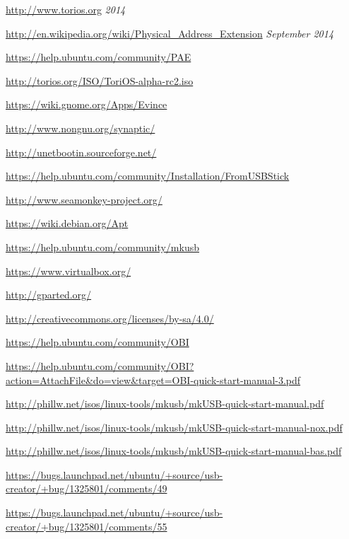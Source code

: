 \documentclass[12pt,a4paper]{book}
\begin{document}
\begin{thebibliography}{1} %

\url{http://www.torios.org}
\emph{2014}

\url{http://en.wikipedia.org/wiki/Physical_Address_Extension}
\emph{September 2014}

\url{https://help.ubuntu.com/community/PAE}

\url{http://torios.org/ISO/ToriOS-alpha-rc2.iso}

\url{https://wiki.gnome.org/Apps/Evince}

\url{http://www.nongnu.org/synaptic/}

\url{http://unetbootin.sourceforge.net/}

\url{https://help.ubuntu.com/community/Installation/FromUSBStick}

\url{http://www.seamonkey-project.org/}

\url{https://wiki.debian.org/Apt}

	
\url{https://help.ubuntu.com/community/mkusb}

\url{https://www.virtualbox.org/}

\url{http://gparted.org/}

\url{http://creativecommons.org/licenses/by-sa/4.0/}

\url{https://help.ubuntu.com/community/OBI	}

\url{https://help.ubuntu.com/community/OBI?action=AttachFile&do=view&target=OBI-quick-start-manual-3.pdf}
	
\url{http://phillw.net/isos/linux-tools/mkusb/mkUSB-quick-start-manual.pdf}
	
	
\url{http://phillw.net/isos/linux-tools/mkusb/mkUSB-quick-start-manual-nox.pdf}

\url{http://phillw.net/isos/linux-tools/mkusb/mkUSB-quick-start-manual-bas.pdf}
	
\url{https://bugs.launchpad.net/ubuntu/+source/usb-creator/+bug/1325801/comments/49}

\url{https://bugs.launchpad.net/ubuntu/+source/usb-creator/+bug/1325801/comments/55}		


\end{thebibliography}
\end{document}
